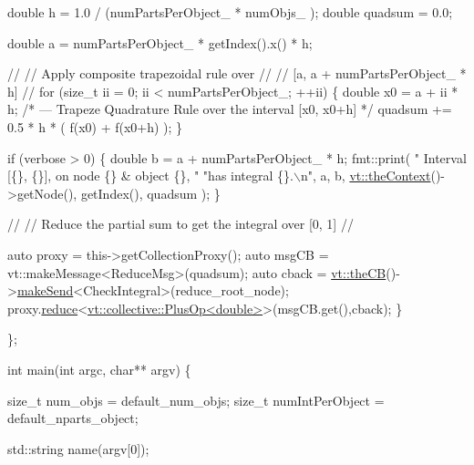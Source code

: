 \begin{DoxyCodeInclude}
    \textcolor{keywordtype}{double} h = 1.0 / (numPartsPerObject\_ * numObjs\_ );
    \textcolor{keywordtype}{double} quadsum = 0.0;

    \textcolor{keywordtype}{double} a = numPartsPerObject\_ * getIndex().x() * h;

    \textcolor{comment}{//}
    \textcolor{comment}{// Apply composite trapezoidal rule over}
    \textcolor{comment}{//}
    \textcolor{comment}{// [a, a + numPartsPerObject\_ * h]}
    \textcolor{comment}{//}
    \textcolor{keywordflow}{for} (\textcolor{keywordtype}{size\_t} ii = 0; ii < numPartsPerObject\_; ++ii) \{
      \textcolor{keywordtype}{double} x0 = a + ii * h;
      \textcolor{comment}{/* --- Trapeze Quadrature Rule over the interval [x0, x0+h] */}
      quadsum += 0.5 * h * ( f(x0) + f(x0+h) );
    \}

    \textcolor{keywordflow}{if} (verbose > 0) \{
      \textcolor{keywordtype}{double} b = a + numPartsPerObject\_ * h;
      fmt::print(
        \textcolor{stringliteral}{" Interval [\{\}, \{\}], on node \{\} & object \{\}, "}
        \textcolor{stringliteral}{"has integral \{\}.\(\backslash\)n"}, a, b, \hyperlink{namespacevt_a26551fe0e6e6a1371111df5b12c7e92c}{vt::theContext}()->getNode(),
        getIndex(), quadsum
      );
    \}

    \textcolor{comment}{//}
    \textcolor{comment}{// Reduce the partial sum to get the integral over [0, 1]}
    \textcolor{comment}{//}

    \textcolor{keyword}{auto} proxy = this->getCollectionProxy();
    \textcolor{keyword}{auto} msgCB = vt::makeMessage<ReduceMsg>(quadsum);
    \textcolor{keyword}{auto} cback = \hyperlink{namespacevt_a673b109e94c7bca58313504c83e1da94}{vt::theCB}()->\hyperlink{structvt_1_1pipe_1_1_pipe_manager_a73583be6260418b13ee66e56cdade2da}{makeSend}<CheckIntegral>(reduce\_root\_node);
    proxy.\hyperlink{structvt_1_1objgroup_1_1proxy_1_1_proxy_a61273d407174fb496b4aed10ec6650bd}{reduce}<\hyperlink{structvt_1_1collective_1_1reduce_1_1operators_1_1_plus_op}{vt::collective::PlusOp<double>}>(msgCB.get(),cback);
  \}

\};


\textcolor{keywordtype}{int} main(\textcolor{keywordtype}{int} argc, \textcolor{keywordtype}{char}** argv) \{

  \textcolor{keywordtype}{size\_t} num\_objs = default\_num\_objs;
  \textcolor{keywordtype}{size\_t} numIntPerObject = default\_nparts\_object;

  std::string name(argv[0]);


\end{DoxyCodeInclude}
